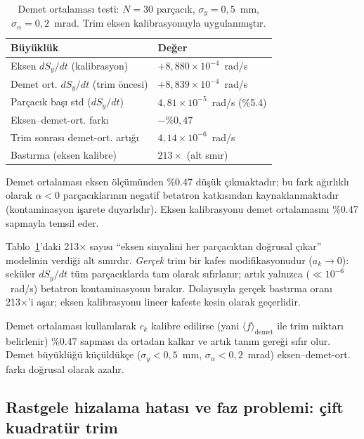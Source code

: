 \documentclass[preprint,12pt]{elsarticle}
\begin{document}
\begin{table}[h]
\centering
\caption{Demet ortalaması testi: $N=30$ parçacık,
$\sigma_y=0{,}5$~mm, $\sigma_\alpha=0{,}2$~mrad.
Trim eksen kalibrasyonuyla uygulanmıştır.}
\label{tab:demet-launch}
\begin{tabular}{ll}
\toprule
Büyüklük & Değer \\
\midrule
Eksen $dS_y/dt$ (kalibrasyon) & $+8{,}880\times10^{-4}$~rad/s \\
Demet ort. $dS_y/dt$ (trim öncesi) & $+8{,}839\times10^{-4}$~rad/s \\
Parçacık başı std ($dS_y/dt$) & $4{,}81\times10^{-5}$~rad/s (\%5.4) \\
Eksen--demet-ort. farkı & $-\%0{,}47$ \\
Trim sonrası demet-ort. artığı & $4{,}14\times10^{-6}$~rad/s \\
Bastırma (eksen kalibre) & $213\times$ (alt sınır) \\
\bottomrule
\end{tabular}
\end{table}

Demet ortalaması eksen ölçümünden \%0.47 düşük çıkmaktadır; bu fark
ağırlıklı olarak $\alpha<0$ parçacıklarının negatif betatron katkısından
kaynaklanmaktadır (kontaminasyon işarete duyarlıdır). Eksen kalibrasyonu
demet ortalamasını \%0.47 sapmayla temsil eder.

Tablo~\ref{tab:demet-launch}'daki 213× sayısı ``eksen sinyalini her
parçacıktan doğrusal çıkar'' modelinin verdiği alt sınırdır.
\emph{Gerçek} trim bir kafes modifikasyonudur ($a_k\to0$):
seküler $dS_y/dt$ tüm parçacıklarda tam olarak sıfırlanır; artık yalnızca
($\ll10^{-6}$~rad/s) betatron kontaminasyonu bırakır. Dolayısıyla gerçek
bastırma oranı 213×'i aşar; eksen kalibrasyonu lineer kafeste kesin
olarak geçerlidir.

Demet ortalaması kullanılarak $c_k$ kalibre edilirse
(yani $\langle f\rangle_\mathrm{demet}$ ile trim miktarı belirlenir)
\%0.47 sapması da ortadan kalkar ve artık tanım gereği sıfır olur.
Demet büyüklüğü küçüldükçe ($\sigma_y<0{,}5$~mm, $\sigma_\alpha<0{,}2$~mrad)
eksen--demet-ort. farkı doğrusal olarak azalır.

\subsection{Rastgele hizalama hatası ve faz problemi: çift kuadratür trim}
\label{sec:trim-faz}
\end{document}
